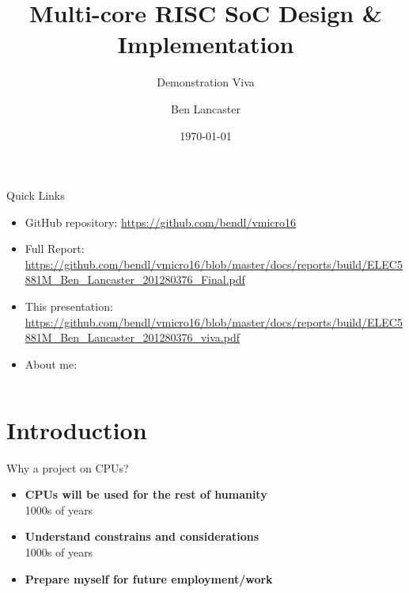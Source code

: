 \documentclass[aspectratio=169]{beamer}
\title
    [Main Project]
    {\textbf{Multi-core RISC SoC Design \& Implementation}}
\subtitle{Demonstration Viva}
\author
    [B. Lancaster]
    {Ben Lancaster}
\institute
    [\hypersetup{urlcolor=jdgrey}%
     \href{https://bendl.me/}{https://bendl.me}
    ]
    {201280376\\
    ELEC5881M - Main Project}
\date
    {\today}
\begin{document}
\begin{frame}[plain]
\titlepage
\end{frame}

\begin{frame}{Quick Links}
\begin{itemize}\setlength\itemsep{1em}
    \item GitHub repository: \url{https://github.com/bendl/vmicro16}
    \item Full Report: \url{https://github.com/bendl/vmicro16/blob/master/docs/reports/build/ELEC5881M_Ben_Lancaster_201280376_Final.pdf}
    \item This presentation: \url{https://github.com/bendl/vmicro16/blob/master/docs/reports/build/ELEC5881M_Ben_Lancaster_201280376_viva.pdf}
    \item About me: 
\end{itemize}
\end{frame}

\begin{frame}
\vspace{-1cm}
\begin{columns}[t]
        \begin{column}{.5\textwidth}
            \tableofcontents[sections={1-3}]
        \end{column}
        \begin{column}{.5\textwidth}
            \tableofcontents[sections={4-5}]
        \end{column}
    \end{columns}
\end{frame}

\section{Introduction}
\frame{\vspace{-1cm}\tableofcontents[currentsection, subsectionstyle=show/show/hide]}

\begin{frame}{Why a project on CPUs?}
\begin{itemize}\setlength\itemsep{1em}
    \item{\textbf{CPUs will be used for the rest of humanity}\\
    1000s of years}
    \item{\textbf{Understand constrains and considerations}\\
    1000s of years}
    \item{\textbf{Prepare myself for future employment/work}}
\end{itemize}
\end{frame}
\end{document}
